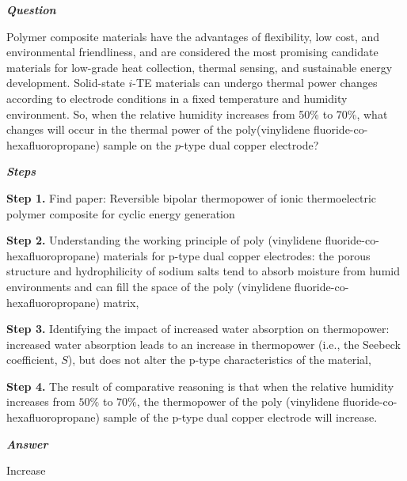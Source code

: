 \begin{tcolorbox}[
    breakable,
    title=Example of Scientific Deep Research in Material,
    colback=LighterGray,
    colframe=DeepPurple,
    colbacktitle=DeepPurple,
    coltitle=White,
]
\textbf{\emph{\textcolor{DeepPurple}{Question}}}

Polymer composite materials have the advantages of flexibility, low cost, and environmental friendliness, and are considered the most promising candidate materials for low-grade heat collection, thermal sensing, and sustainable energy development. Solid-state $i$-TE materials can undergo thermal power changes according to electrode conditions in a fixed temperature and humidity environment. So, when the relative humidity increases from 50\% to 70\%, what changes will occur in the thermal power of the poly(vinylidene fluoride-co-hexafluoropropane) sample on the $p$-type dual copper electrode?

\textbf{\emph{\textcolor{DeepPurple}{Steps}}}

\textbf{\textcolor{CaseOrange}{Step 1.}} Find paper: Reversible bipolar thermopower of ionic thermoelectric polymer composite for cyclic energy generation

\textbf{\textcolor{CaseOrange}{Step 2.}} Understanding the working principle of poly (vinylidene fluoride-co-hexafluoropropane) materials for p-type dual copper electrodes: the porous structure and hydrophilicity of sodium salts tend to absorb moisture from humid environments and can fill the space of the poly (vinylidene fluoride-co-hexafluoropropane) matrix,

\textbf{\textcolor{CaseOrange}{Step 3.}} Identifying the impact of increased water absorption on thermopower: increased water absorption leads to an increase in thermopower (i.e., the Seebeck coefficient, $S$), but does not alter the p-type characteristics of the material,

\textbf{\textcolor{CaseOrange}{Step 4.}} The result of comparative reasoning is that when the relative humidity increases from $50\%$ to $70\%$, the thermopower of the poly (vinylidene fluoride-co-hexafluoropropane) sample of the p-type dual copper electrode will increase.


\textbf{\emph{\textcolor{DeepPurple}{Answer}}}

Increase

\end{tcolorbox}
